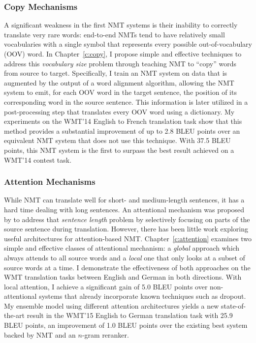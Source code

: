\subsubsection*{Copy Mechanisms} 
A significant weakness in the first NMT 
systems is their inability to correctly translate very rare words:  
end-to-end NMTs tend to have relatively small vocabularies with a single
\unk{} symbol that represents every possible out-of-vocabulary (OOV) word. In
Chapter~\ref{c:copy}, I propose simple and effective techniques to address this
{\it vocabulary size} problem through teaching NMT to ``copy'' words from source to
target. Specifically, I train an NMT system on data that is augmented by the output of a word 
alignment algorithm, allowing the NMT system to emit, for each OOV word
in the target sentence, the position of its corresponding word in the source sentence.
This information is later utilized in a
post-processing step that translates every OOV word using a dictionary. My 
experiments on the WMT'14 English to French translation task show that this 
method provides a substantial improvement of up to 2.8 BLEU points over an
equivalent NMT system that does not use this technique. 
With 37.5 BLEU points, this NMT system is the first to surpass 
the best result achieved on a WMT'14 contest task. 

\subsubsection{Attention Mechanisms} 
While NMT can translate well for short- and medium-length sentences, it 
has a hard time dealing with long sentences.
An attentional mechanism was proposed by  to address that {\it
sentence length} problem by
selectively focusing on parts of the source sentence during translation. However,
there has been little work exploring useful architectures for attention-based
NMT. Chapter~\ref{c:attention} examines two simple and effective classes of attentional
mechanism: a {\it global} approach which always attends to all source words and
a {\it local} one that only looks at a subset of source words at a time. 
I demonstrate the effectiveness of both approaches on the WMT translation
tasks between English and German in both directions. With local
attention, I achieve a significant gain of 5.0 BLEU points over
non-attentional systems that 
already incorporate known techniques such as dropout. My ensemble 
model using different attention architectures yields a new
state-of-the-art result in the WMT'15 English to German
translation task with 25.9 BLEU points, an improvement of 1.0 BLEU points over the existing
best system backed by NMT and an $n$-gram reranker. 

